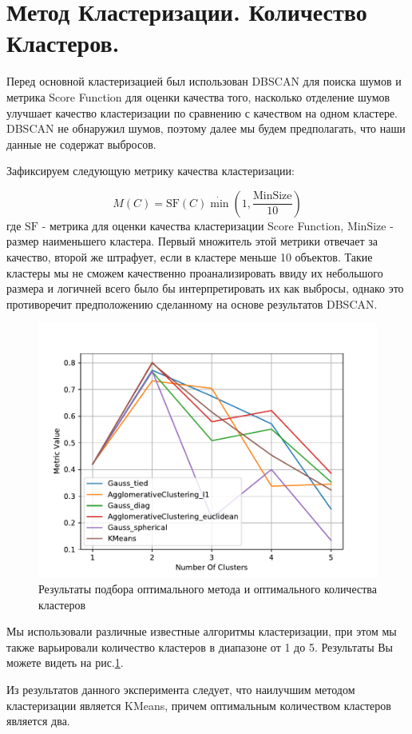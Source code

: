 \documentclass[12pt]{article}
\begin{document}
\section{Метод Кластеризации. Количество Кластеров.}

Перед основной кластеризацией был использован DBSCAN для поиска шумов и метрика Score Function для оценки качества того, насколько отделение шумов улучшает качество кластеризации по сравнению с качеством на одном кластере. DBSCAN не обнаружил шумов, поэтому далее мы будем предполагать, что наши данные не содержат выбросов.

Зафиксируем следующую метрику качества кластеризации:

$$M(C) = \text{SF}(C) \dot \min\left(1, \frac{\text{MinSize}}{10}\right)$$
где $\text{SF}$ - метрика для оценки качества кластеризации Score Function, $\text{MinSize}$ - размер наименьшего кластера. Первый множитель этой метрики отвечает за качество, второй же штрафует, если в кластере меньше 10 объектов. Такие кластеры мы не сможем качественно проанализировать ввиду их небольшого размера и логичней всего было бы интерпретировать их как выбросы, однако это противоречит предположению сделанному на основе результатов DBSCAN.
\begin{figure}[ht!]  
\centering \includegraphics[width=0.7\linewidth]{Images/clusters_number.pdf}

\caption{Результаты подбора оптимального метода и оптимального количества кластеров} \label{choice}
\end{figure}

Мы использовали различные известные алгоритмы кластеризации, при этом мы также варьировали количество кластеров в диапазоне от 1 до 5. Результаты Вы можете видеть на рис.\ref{choice}.



Из результатов данного эксперимента следует, что наилучшим методом кластеризации является KMeans, причем оптимальным количеством кластеров является два.
\end{document}
